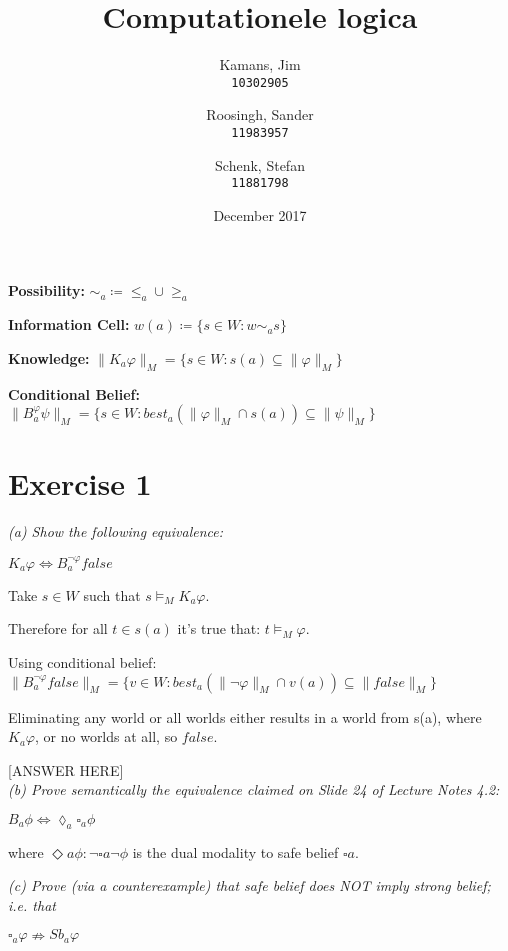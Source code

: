 \documentclass[leqno]{article}
\title{Computationele logica}
\author{
    Kamans, Jim\\
    \texttt{10302905}
    \and
    Roosingh, Sander\\
    \texttt{11983957}
    \and
    Schenk, Stefan\\
    \texttt{11881798}
}
\date{December 2017}
\begin{document}
\maketitle

\textbf{Possibility:} $\sim_a \coloneqq \leq_a \cup \geq_a$

\textbf{Information Cell:} $w(a) \coloneqq \{s\in W:w\sim_a s\}$

\textbf{Knowledge:} $\lVert K_a \varphi \rVert_M = \{s\in W:s(a) \subseteq
\lVert \varphi \rVert_M\}$

\textbf{Conditional Belief:} $\lVert B_a^\varphi \psi \rVert_M = \{s \in
W:best_a(\lVert\varphi\rVert_M \cap s(a)) \subseteq \lVert\psi\rVert_M\}$


\section*{Exercise 1}

\textit{(a) Show the following equivalence:}
\begin{center}
    $K_a \varphi \Leftrightarrow B_a^{\neg \varphi} false$
\end{center}

Take $s \in W$ such that $s \models_M K_a \varphi$.

Therefore for all $t \in s(a)$ it's true that: $t \models_M
\varphi$.

Using conditional belief:
$\lVert B_a^{\neg \varphi}false\rVert_M=\{v\in W:best_a(\lVert\neg\varphi\rVert_M\cap v(a))\subseteq\lVert false\rVert_M\}$

Eliminating any world or all worlds either results in a world from s(a), where $K_a \varphi$, or no worlds at all, so $false$.

[ANSWER HERE] \\


\textit{(b) Prove semantically the equivalence claimed on Slide 24 of Lecture
Notes 4.2:}
\begin{center}
    $B_a \phi \Leftrightarrow \lozenge_a \square_a \phi$
\end{center}
where $\Diamond a \phi : \neg \square a \neg \phi$ is the dual modality to safe
belief $\square a$.





\textit{(c) Prove (via a counterexample) that safe belief does NOT imply strong
belief; i.e. that}
\begin{center}
    $\square_a \varphi \nRightarrow Sb_a \varphi$
\end{center}
\end{document}
